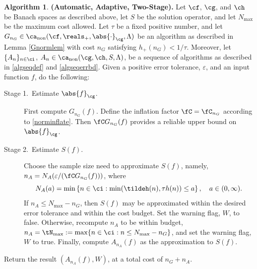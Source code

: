 \documentclass[]{elsarticle}
\DeclareMathOperator{\fix}{non}
\theoremstyle{definition}
\newtheorem{algo}{Algorithm}
\theoremstyle{remark}
\newcommand{\Gnorm}[1]{\abs{#1}_{\cg}}
\begin{document}
\begin{algo} \label{twostagedetalgo} {\bf (Automatic, Adaptive, Two-Stage).} Let $\cf$, $\cg$, and $\ch$ be Banach spaces as described above, let $S$ be the solution operator, and let $N_{\max}$ be the maximum cost allowed.  Let $\tau$ be a fixed positive number, and let $G_{n_G} \in \ca_{\fix}(\cf,\reals_+,\Gnorm{\cdot},\Lambda)$ be an algorithm as described in Lemma \ref{Gnormlem} with cost $n_G$ satisfying $h_{+}(n_G) < 1/\tau$.
Moreover, let  $\{A_n\}_{n \in \ci}$, $A_n  \in \ca_{\fix}(\cg,\ch,S,\Lambda)$, be a sequence of algorithms as described in \eqref{algseqdef} and \eqref{algseqerrbd}.  Given  a positive error tolerance, $\varepsilon$, and  an input function $f$, do the following:

\begin{description} 

\item[Stage 1.\ Estimate {$\Gnorm{f}$}.] First compute $G_{n_G}(f)$.  Define the inflation factor $\fC=\fC_{n_G}$ according to \eqref{norminflate}.
Then $\fC G_{n_G}(f)$ provides a reliable upper bound on $\Gnorm{f}$.  

\item [Stage 2.\ Estimate {$S(f)$}.] Choose the sample size need to approximate $S(f)$, namely, $n_A=N_{A}(\varepsilon/(\fC G_{n_G}(f)))$, where 
\begin{equation} \label{Nmindef}
N_{A}(a)= \min\left\{ n \in \ci : \min(\tildeh(n),\tau h(n)) \le a \right\}, \quad a \in (0,\infty).
\end{equation}
If $n_A \le N_{\max}-n_G$, then $S(f)$ may be approximated within the desired error tolerance and within the cost budget.  Set the warning flag, $W$, to false. 
Otherwise, recompute $n_A$ to be within budget, $n_A = \tN_{\max} := \max\{n \in \ci : n\le N_{\max} -  n_G\}$, and set the warning flag, $W$ to true.  Finally, compute $A_{n_A}(f)$ as the approximation to $S(f)$.
\end{description}

Return the result $(A_{n_A}(f),W)$, at a total cost of $n_G+n_A$.  
\end{algo}
\end{document}
